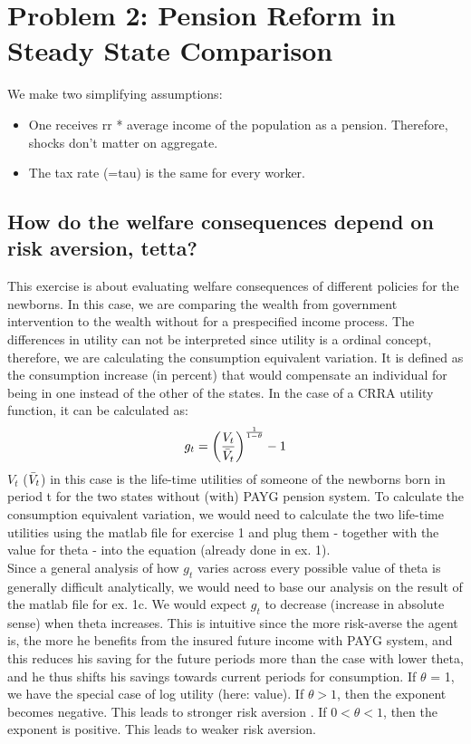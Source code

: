 \documentclass[12pt,a4paper]{article}
\begin{document}
\section{Problem 2: Pension Reform in Steady State Comparison}
We make two simplifying assumptions: 
\begin{itemize}
    \item One receives rr * average income of the population as a pension. Therefore, shocks don't matter on aggregate. 
    \item The tax rate (=tau) is the same for every worker.
\end{itemize}

\subsection{How do the welfare consequences depend on risk aversion, tetta?}

This exercise is about evaluating welfare consequences of different policies for the newborns. In this case, we are
comparing the wealth from government intervention to the wealth without for a prespecified income
process. The differences in utility can not be interpreted since utility is a ordinal concept, therefore,
we are calculating the consumption equivalent variation. It is defined as the consumption increase
(in percent) that would compensate an individual for being in one instead of the other of the states.
In the case of a CRRA utility function, it can be calculated as:
\begin{equation*}
    g_t=\bigg(\frac{V_t}{\Bar{V}_t}\bigg)^\frac{1}{1-\theta}-1
\end{equation*}
$V_t$ ($\Bar{V}_t$) in this case is the life-time utilities of someone of the newborns born in period t for the
two states without (with) PAYG pension system. To calculate the consumption equivalent variation, we would need to calculate the two life-time utilities using the matlab file for exercise 1 and plug them - together with the value for theta - into the equation (already done in ex. 1).\\
Since a general analysis of how $g_t$ varies across every possible value of theta is generally difficult analytically, we would need to base our analysis on the result of the matlab file for ex. 1c.  
We would expect $g_t$ to decrease (increase in absolute sense) when theta increases. This is intuitive since the more risk-averse the agent is, the more he benefits from the insured future income with PAYG system, and this reduces his saving for the future periods more than the case with lower theta, and he thus shifts his savings towards current periods for consumption. If $\theta$ = 1, we have the special case of log utility (here: value). If $\theta > 1$, then the exponent becomes negative. This leads to stronger risk aversion . If $0 < \theta < 1$, then the exponent is positive. This leads to weaker risk aversion.
\end{document}
